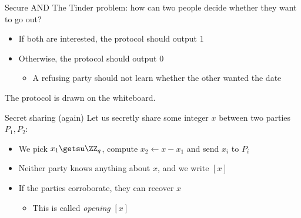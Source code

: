 \begin{frame}{Secure AND}
  \pause
  The Tinder problem: how can two people decide whether they want to go out?
  \begin{itemize}[<+(1)->]
    \item If both are interested, the protocol should output $1$
    \item Otherwise, the protocol should output $0$
    \par
    \begin{itemize}
      \item A refusing party should not learn whether the other wanted the date
    \end{itemize}
  \end{itemize}

  \vspace*{1em}

  \pause
  The protocol is drawn on the whiteboard.
\end{frame}

\begin{frame}{Secret sharing (again)}
  Let us secretly share some integer $x$ between two parties $P_1, P_2$:
  \begin{itemize}[<+(1)->]
    \item We pick $x_1 \getsu \ZZ_q$, compute $x_2 \gets x - x_1$ and send $x_i$ to $P_i$
    \item Neither party knows anything about $x$, and we write $[x]$
    \item If the parties corroborate, they can recover $x$
    \par
    \begin{itemize}
      \item This is called \emph{opening} $[x]$
    \end{itemize}
  \end{itemize}
\end{frame}

